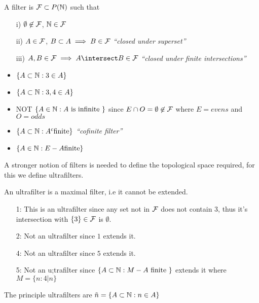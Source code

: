\documentclass[a4paper]{article}
\begin{document}
\begin{defi}[Filter]
  A filter is $\mathcal{F} \subset P(\mathbb{N})$ such that
  \begin{itemize}
    \item[i)] $\emptyset \not\in \mathcal{F}$, $\mathbb{N} \in \mathcal{F}$
    \item[ii)] $A \in \mathcal{F}$, $B \subset A \implies B \in \mathcal{F}$ \textit{``closed
        under superset''}
      \item[iii)] $A, B \in \F \implies A \intersect B \in \F$ \textit{``closed
          under finite intersections''}
        
\end{itemize}
\end{defi}
\begin{eg}
\begin{itemize}
  \item $\{ A \subset \mathbb{N} : 3 \in A\}$
  \item $\{ A \subset \mathbb{N} : 3, 4 \in A\}$
  \item NOT $\{A \in \mathbb{N} : A \text{ is infinite }\}$ since $E \cap
  O = \emptyset \not\in \mathcal{F}$ where $E = evens$ and $O = odds$
\item $\{A \subset \mathbb{N} : A^c \text{finite}\}$ \textit{``cofinite filter''}
  \item $\{A \in \mathbb{N} : E - A \text{finite}\}$
  \end{itemize}
\end{eg}
A stronger notion of filters is needed to define the topological space required,
for this we define ultrafilters.
\begin{defi}[Ultrafilter]
  An ultrafilter is a maximal filter, i.e it cannot be extended.
\end{defi}
\begin{eg}
  \begin{itemize}
    \item[1:] This is an ultrafilter since any set not in $\mathcal{F}$ does not contain
      $3$, thus it's intersection with $\{3\} \in \mathcal{F}$ is $\emptyset$.
    \item[2:] Not an ultrafilter since $1$ extends it.
    \item[4:] Not an ultrafilter since $5$ extends it.
      \item[5:] Not an u;trafilter since $\{A \subset \mathbb{N} : M - A \text{ finite
        }\}$ extends it where $M = \{n : 4 | n\}$
    \end{itemize}
  \end{eg}
\begin{defi}
  The principle ultrafilters are $\tilde{n} = \{A \subset \mathbb{N} : n \in A\}$
\end{defi}
\end{document}
